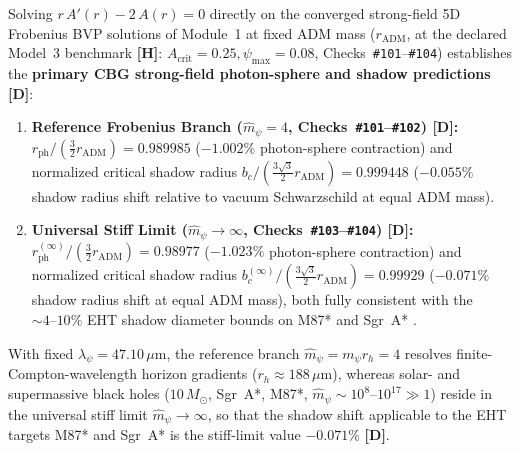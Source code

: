 \documentclass[11pt,a4paper]{article}
\newcommand{\catD}{\textbf{\textcolor{blue!75!black}{[D]}}}
\newcommand{\catH}{\textbf{\textcolor{orange!85!black}{[H]}}}
\theoremstyle{plain}
\theoremstyle{definition}
\theoremstyle{remark}
\numberwithin{equation}{section}
\begin{document}
Solving $r\,A'(r) - 2\,A(r) = 0$ directly on the converged strong-field 5D Frobenius BVP solutions of Module~1 at fixed ADM mass ($r_{\text{ADM}}$, at the declared Model~3 benchmark \catH: $A_{\text{crit}} = 0.25, \psi_{\max} = 0.08$, Checks~\texttt{\#101}--\texttt{\#104}) establishes the \textbf{primary CBG strong-field photon-sphere and shadow predictions} \catD:
\begin{enumerate}
    \item \textbf{Reference Frobenius Branch ($\hat{m}_{\psi} = 4$, Checks~\texttt{\#101}--\texttt{\#102}) \catD:} $r_{\text{ph}} / (\frac{3}{2}r_{\text{ADM}}) = \mathbf{0.989985}$ ($-1.002\%$ photon-sphere contraction) and normalized critical shadow radius $b_c / (\frac{3\sqrt{3}}{2}r_{\text{ADM}}) = \mathbf{0.999448}$ ($\mathbf{-0.055\%}$ shadow radius shift relative to vacuum Schwarzschild at equal ADM mass).
    \item \textbf{Universal Stiff Limit ($\hat{m}_{\psi} \to \infty$, Checks~\texttt{\#103}--\texttt{\#104}) \catD:} $r_{\text{ph}}^{(\infty)} / (\frac{3}{2}r_{\text{ADM}}) = \mathbf{0.98977}$ ($-1.023\%$ photon-sphere contraction) and normalized critical shadow radius $b_c^{(\infty)} / (\frac{3\sqrt{3}}{2}r_{\text{ADM}}) = \mathbf{0.99929}$ ($\mathbf{-0.071\%}$ shadow radius shift at equal ADM mass), both fully consistent with the $\sim 4\text{--}10\%$ EHT shadow diameter bounds on M87* and Sgr~A* \cite{eht2019,eht2022}.
\end{enumerate}
With fixed $\lambda_{\psi} = 47.10\,\mu\text{m}$, the reference branch $\hat{m}_{\psi} = m_{\psi} r_h = 4$ resolves finite-Compton-wavelength horizon gradients ($r_h \approx 188\,\mu\text{m}$), whereas solar- and supermassive black holes ($10\,M_\odot$, Sgr~A*, M87*, $\hat{m}_{\psi} \sim 10^{8}\text{--}10^{17} \gg 1$) reside in the universal stiff limit $\hat{m}_{\psi} \to \infty$, so that the shadow shift applicable to the EHT targets M87* and Sgr~A* is the stiff-limit value $\mathbf{-0.071\%}$ \catD.
\end{document}
